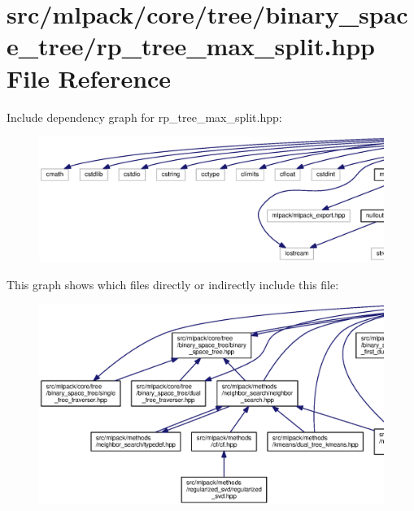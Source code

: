 \section{src/mlpack/core/tree/binary\+\_\+space\+\_\+tree/rp\+\_\+tree\+\_\+max\+\_\+split.hpp File Reference}
\label{rp__tree__max__split_8hpp}
Include dependency graph for rp\+\_\+tree\+\_\+max\+\_\+split.\+hpp\+:
\nopagebreak
\begin{figure}[H]
\begin{center}
\leavevmode
\includegraphics[width=350pt]{rp__tree__max__split_8hpp__incl}
\end{center}
\end{figure}
This graph shows which files directly or indirectly include this file\+:
\nopagebreak
\begin{figure}[H]
\begin{center}
\leavevmode
\includegraphics[width=350pt]{rp__tree__max__split_8hpp__dep__incl}
\end{center}
\end{figure}
